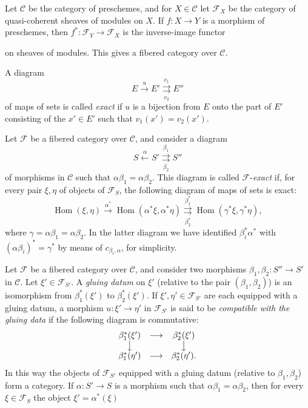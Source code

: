  Let $\mathcal C$ be the category of preschemes, and for
$X\in\mathcal C$ let $\mathcal F_X$ be the category of quasi-coherent sheaves
of modules on $X$. If $f:X\longrightarrow Y$ is a morphism of preschemes, then
$f^*:\mathcal F_Y\longrightarrow\mathcal F_X$ is the inverse-image functor

on sheaves of modules. This gives a fibered category over $\mathcal C$.

 A diagram
\[
  E\xrightarrow{u}E'
  \overset{v_1}{\underset{v_2}{\rightrightarrows}}E''
\]
of maps of sets is called \emph{exact} if $u$ is a bijection from $E$ onto the
part of $E'$ consisting of the $x'\in E'$ such that $v_1(x')=v_2(x')$.

 Let $\mathcal F$ be a fibered category over
$\mathcal C$, and consider a diagram
\[
  \tag{+}
  S\xleftarrow{\alpha}S'
  \overset{\beta_1}{\underset{\beta_2}{\rightrightarrows}}S''
\]
of morphisms in $\mathcal C$ such that
$\alpha\beta_1=\alpha\beta_2$. This diagram is called
$\mathcal F$-\emph{exact} if, for every pair $\xi,\eta$ of objects of
$\mathcal F_S$, the following diagram of maps of sets is exact:
\[
  \tag{+'}
  \operatorname{Hom}(\xi,\eta)
  \xrightarrow{\alpha^*}
  \operatorname{Hom}(\alpha^*\xi,\alpha^*\eta)
  \overset{\beta_1^*}{\underset{\beta_2^*}{\rightrightarrows}}
  \operatorname{Hom}(\gamma^*\xi,\gamma^*\eta),
\]
where $\gamma=\alpha\beta_1=\alpha\beta_2$. In the latter diagram we have
identified $\beta_i^*\alpha^*$ with
$(\alpha\beta_i)^*=\gamma^*$ by means of $c_{\beta_i,\alpha}$, for simplicity.

 Let $\mathcal F$ be a fibered category over
$\mathcal C$, and consider two morphisms
$\beta_1,\beta_2:S''\longrightarrow S'$ in $\mathcal C$. Let
$\xi'\in\mathcal F_{S'}$. A \emph{gluing datum} on $\xi'$ (relative to the pair
$(\beta_1,\beta_2)$) is an isomorphism from $\beta_1^*(\xi')$ to
$\beta_2^*(\xi')$. If $\xi',\eta'\in\mathcal F_{S'}$ are each equipped with a
gluing datum, a morphism $u:\xi'\longrightarrow\eta'$ in
$\mathcal F_{S'}$ is said to be \emph{compatible with the gluing data} if the
following diagram is commutative:
\[
\begin{array}{ccc}
  \beta_1^*(\xi') & \longrightarrow & \beta_2^*(\xi') \\
  \big\downarrow && \big\downarrow \\
  \beta_1^*(\eta') & \longrightarrow & \beta_2^*(\eta').
\end{array}
\]
In this way the objects of $\mathcal F_{S'}$ equipped with a gluing datum
(relative to $\beta_1,\beta_2$) form a category. If
$\alpha:S'\longrightarrow S$ is a morphism such that
$\alpha\beta_1=\alpha\beta_2$, then for every $\xi\in\mathcal F_S$ the object
$\xi'=\alpha^*(\xi)$


